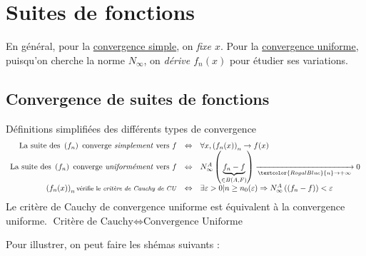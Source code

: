 \documentclass[11pt,a4paper,fleqn,pdftex]{report}
\begin{document}
\chapter{Suites de fonctions}
\begin{methode}
    En général, pour la \uline{convergence simple}, on \emph{fixe $x$}. Pour la \uline{convergence uniforme}, puisqu'on cherche la norme $N_\infty$, on \emph{dérive $f_n(x)$} pour étudier ses variations.
\end{methode}
\section{Convergence de suites de fonctions}
\begin{dfn}
Définitions simplifiées des différents types de convergence
\begin{equation}\label{CV fonctions}
\begin{array}{r c l}
\text{La suite des }\left(f_n\right) \text{ converge \emph{simplement} vers } f&\Leftrightarrow &\forall x, \left(f_n(x)\right)_n \to f(x)\\
\text{La suite des }\left(f_n\right) \text{ converge \emph{uniformément} vers } f&\Leftrightarrow &N^A_\infty\left(\underbrace{f_n-f}_{\in B(A,F)}\right)\xrightarrow[\textcolor{RoyalBlue}{n}\to +\infty]{}0\\
\left(f_n(x)\right)_n\text{{\footnotesize  vérifie le \emph{critère de Cauchy de CU}}}&\Leftrightarrow&\exists \varepsilon>0 | n\ge n_0(\varepsilon) \Rightarrow N^A_\infty\left((f_n-f)\right)< \varepsilon\\
\end{array}
\end{equation}
Le critère de Cauchy de convergence uniforme est équivalent à la convergence uniforme. $\boxed{\text{Critère de Cauchy}\Leftrightarrow\text{Convergence Uniforme}}$
\end{dfn}
Pour illustrer, on peut faire les shémas suivants : 
\end{document}
